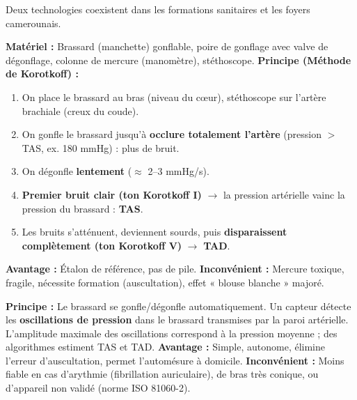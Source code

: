 \documentclass[11pt]{article}
\begin{document}
Deux technologies coexistent dans les formations sanitaires et les foyers camerounais.

\begin{experience}
\textbf{Matériel :} Brassard (manchette) gonflable, poire de gonflage avec valve de dégonflage, colonne de mercure (manomètre), stéthoscope.
\textbf{Principe (Méthode de Korotkoff) :}
\begin{enumerate}
    \item On place le brassard au bras (niveau du cœur), stéthoscope sur l'artère brachiale (creux du coude).
    \item On gonfle le brassard jusqu'à \textbf{occlure totalement l'artère} (pression $>$ TAS, ex. 180 mmHg) : plus de bruit.
    \item On dégonfle \textbf{lentement} ($\approx$ 2--3 mmHg/s).
    \item \textbf{Premier bruit clair (ton Korotkoff I)} $\rightarrow$ la pression artérielle vainc la pression du brassard : \textbf{TAS}.
    \item Les bruits s'atténuent, deviennent sourds, puis \textbf{disparaissent complètement (ton Korotkoff V)} $\rightarrow$ \textbf{TAD}.
\end{enumerate}
\textbf{Avantage :} Étalon de référence, pas de pile. \textbf{Inconvénient :} Mercure toxique, fragile, nécessite formation (auscultation), effet « blouse blanche » majoré.
\end{experience}

\begin{experience}
\textbf{Principe :} Le brassard se gonfle/dégonfle automatiquement. Un capteur détecte les \textbf{oscillations de pression} dans le brassard transmises par la paroi artérielle. L'amplitude maximale des oscillations correspond à la pression moyenne ; des algorithmes estiment TAS et TAD.
\textbf{Avantage :} Simple, autonome, élimine l'erreur d'auscultation, permet l'automésure à domicile.
\textbf{Inconvénient :} Moins fiable en cas d'arythmie (fibrillation auriculaire), de bras très conique, ou d'appareil non validé (norme ISO 81060-2).
\end{experience}
\end{document}
